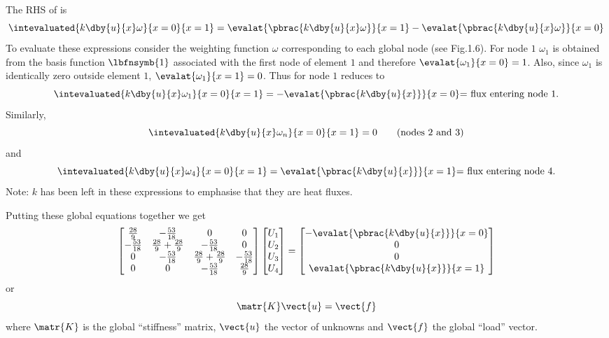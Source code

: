 The RHS of  is 
\begin{equation}
  \intevaluated{k\dby{u}{x}\omega}{x=0}{x=1}=\evalat{\pbrac{k\dby{u}{x}\omega}}{x=1}
    -\evalat{\pbrac{k\dby{u}{x}\omega}}{x=0}
  \label{eqn:a1}
\end{equation}
To evaluate these expressions consider the weighting function $\omega$
corresponding to each global node (see Fig.1.6). For node $1$ $\omega_{1}$ is
obtained from the basis function $\lbfnsymb{1}$ associated with the first node of
element $1$ and therefore $\evalat{\omega_{1}}{x=0}=1$. Also, since $\omega_{1}$ is
identically zero outside element $1$, $\evalat{\omega_{1}}{x=1}=0$. Thus
 for node $1$ reduces to
\begin{equation*}
  \intevaluated{k\dby{u}{x}\omega_{1}}{x=0}{x=1}=-\evalat{\pbrac{k\dby{u}{x}}}{x=0}
    \text{= flux entering node $1$.}
\end{equation*}
Similarly,
\begin{equation*}
  \intevaluated{k\dby{u}{x}\omega_{n}}{x=0}{x=1}=0\quad\quad\text{(nodes $2$ and $3$)}
\end{equation*}
and
\begin{equation*}
  \intevaluated{k\dby{u}{x}\omega_{4}}{x=0}{x=1}=\evalat{\pbrac{k\dby{u}{x}}}{x=1}
    \mbox{= flux entering node $4$.}
\end{equation*}
Note: $k$ has been left in these expressions to emphasise that they are heat 
fluxes.

Putting these global equations together we get
\begin{equation}
  \begin{bmatrix}    
    \frac{28}{9} & -\frac{53}{18} & 0 & 0 \\
    -\frac{53}{18} & \frac{28}{9}+\frac{28}{9} & -\frac{53}{18} & 0 \\
    0 & -\frac{53}{18} & \frac{28}{9}+\frac{28}{9} & -\frac{53}{18} \\
    0 & 0 &-\frac{53}{18} & \frac{28}{9}
  \end{bmatrix}
  \begin{bmatrix}
    U_{1} \\
    U_{2} \\
    U_{3} \\
    U_{4}
  \end{bmatrix} =
  \begin{bmatrix}
    -\evalat{\pbrac{k\dby{u}{x}}}{x=0} \\
    0 \\
    0 \\
    \evalat{\pbrac{k\dby{u}{x}}}{x=1}
  \end{bmatrix}
  \label{eqn:globaleqn}
\end{equation}    
or
\begin{equation*}
  \matr{K}\vect{u}=\vect{f}
\end{equation*}
where $\matr{K}$ is the global ``stiffness'' matrix, $\vect{u}$ the vector of
unknowns and $\vect{f}$ the global ``load'' vector.

